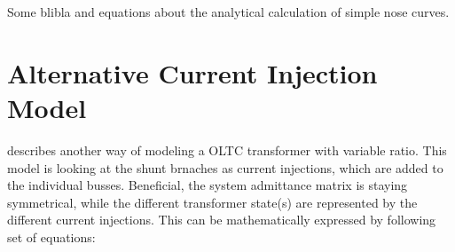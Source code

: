 Some blibla and equations about the analytical calculation of simple nose curves.


\section{Alternative Current Injection Model}
\label{app:current-injection-model}

\textcite{machowski_2020} describes another way of modeling a \acs{OLTC} transformer with variable ratio.
This model is looking at the shunt brnaches as current injections, which are added to the individual busses.
Beneficial, the system admittance matrix is staying symmetrical, while the different transformer state(s) are represented by the different current injections.
This can be mathematically expressed by following set of equations:
